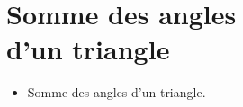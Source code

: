 \themaG
\graphicspath{{../../S09_Somme_des_angles_d_un_triangle/Images/}}

\chapter{Somme des angles\\d'un triangle}
\label{S09}

\begin{prerequis}
   \begin{itemize}
      \item Somme des angles d'un triangle.
   \end{itemize}
\end{prerequis}

\vfill


